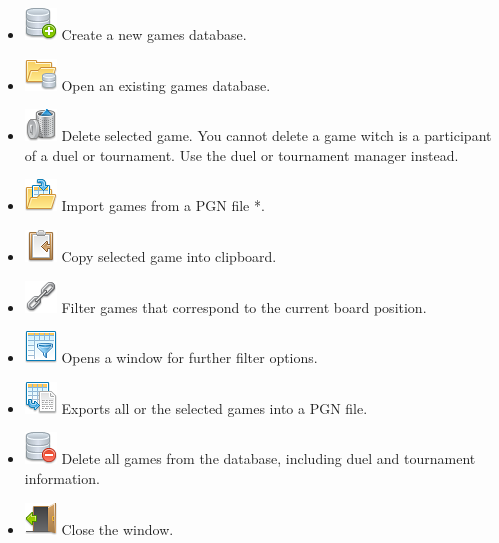 \documentclass[11pt,a4paper]{article}
\begin{document}
\begin{itemize}
	\item \includegraphics[scale=0.5]{database_add.png} Create a new games database.
	\item \includegraphics[scale=0.5]{folder_database.png} Open an existing games database.
	\item \includegraphics[scale=0.5]{bin.png} Delete selected game. You cannot delete a game witch is a participant of a duel or tournament. Use the duel or tournament manager instead.
	\item \includegraphics[scale=0.5]{saved_imports.png} Import games from a PGN file {\color{red}*}.	
	\item \includegraphics[scale=0.5]{clipboard_sign_out.png} Copy selected game into clipboard.		
	\item \includegraphics[scale=0.5]{link.png} Filter games that correspond to the current board position.	
	\item \includegraphics[scale=0.5]{table_filter.png} Opens a window for further filter options.		
	\item \includegraphics[scale=0.5]{text_exports.png} Exports all or the selected games into a PGN file.
	\item \includegraphics[scale=0.5]{database_delete.png} Delete all games from the database, including duel and tournament information.
	\item \includegraphics[scale=0.5]{door_out.png} Close the window.
\end{itemize}
\end{document}
